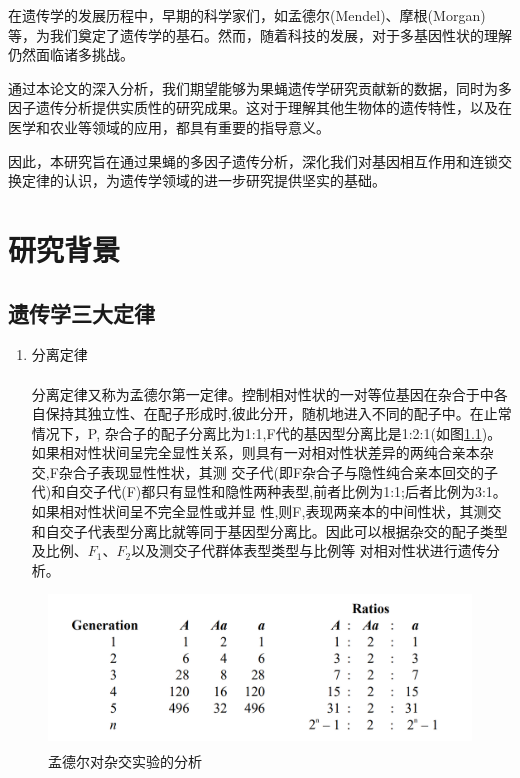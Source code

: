 \documentclass[AutoFakeBold]{LZUThesis}
\newcommand{\upcite}[1]{\textsuperscript{\textsuperscript{\cite{#1}}}}
\begin{document}
在遗传学的发展历程中，早期的科学家们，如孟德尔(Mendel)、摩根(Morgan)等，为我们奠定了遗传学的基石。然而，随着科技的发展，对于多基因性状的理解仍然面临诸多挑战。

通过本论文的深入分析，我们期望能够为果蝇遗传学研究贡献新的数据，同时为多因子遗传分析提供实质性的研究成果。这对于理解其他生物体的遗传特性，以及在医学和农业等领域的应用，都具有重要的指导意义。

因此，本研究旨在通过果蝇的多因子遗传分析，深化我们对基因相互作用和连锁交换定律的认识，为遗传学领域的进一步研究提供坚实的基础。
\chapter{研究背景}
\section{遗传学三大定律}
\begin{enumerate}
\item 分离定律\par
\hspace{2em}分离定律\upcite{mendel1996}又称为孟德尔第一定律。控制相对性状的一对等位基因在杂合于中各自保持其独立性、在配子形成时,彼此分开，随机地进入不同的配子中。在止常情况下，P,
杂合子的配子分离比为1:1,F代的基因型分离比是1:2:1(如图\ref{fig:1})。如果相对性状间呈完全显性关系，则具有一对相对性状差异的两纯合亲本杂交,F杂合子表现显性性状，其测
交子代(即F杂合子与隐性纯合亲本回交的子代)和自交子代(F)都只有显性和隐性两种表型,前者比例为1:1;后者比例为3:1。如果相对性状间呈不完全显性或并显
性,则F,表现两亲本的中间性状，其测交和自交子代表型分离比就等同于基因型分离比。因此可以根据杂交的配子类型及比例、$F_1$、$F_2$以及测交子代群体表型类型与比例等
对相对性状进行遗传分析。
\end{enumerate}

\begin{figure}[htbp]
    \centering
    \includegraphics[width=1.1\textwidth]{img/mendel}
    \caption{孟德尔对杂交实验的分析\upcite{mendel1996}}
    \label{fig:1}
\end{figure}
\end{document}
